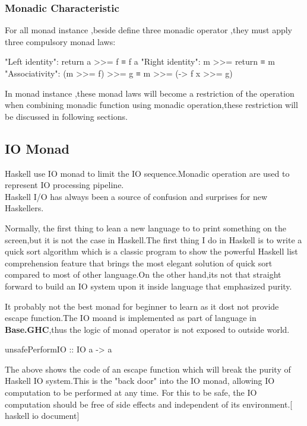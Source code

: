 \subsubsection{Monadic Characteristic}
For all monad instance ,beside define three monadic operator ,they must apply three compulsory monad laws:

\begin{hcode}
"Left identity": return a >>= f  ≡  f a
"Right identity": m >>= return  ≡  m
"Associativity": (m >>= f) >>= g  ≡  m >>= (\x -> f x >>= g)
\end{hcode}

In monad instance ,these monad laws will become a restriction of the operation when combining monadic function using monadic operation,these restriction will be discussed in following sections.


\subsection{IO Monad}
Haskell use IO monad to limit the IO sequence.Monadic operation are used to represent IO processing pipeline.\\

Haskell I/O has always been a source of confusion and surprises for new Haskellers.

Normally, the first thing to lean a new language to to print something on the screen,but it is not the case in Haskell.The first thing I do in Haskell is to write a quick sort algorithm which is a classic program to show the powerful Haskell list comprehension feature that brings the most elegant solution of quick sort compared to most of other language.On the other hand,its not that straight forward to build an IO system upon it inside language that emphasized purity.



It probably not the best monad for beginner to learn as it dost not provide escape function.The IO moand is implemented as part of language in \textbf{Base.GHC},thus the logic of monad operator is not exposed to outside world.

\begin{hcode}
unsafePerformIO :: IO a -> a
\end{hcode}

The above shows the code of an escape function which will break the purity of Haskell IO system.This is the "back door" into the IO monad, allowing IO computation to be performed at any time. For this to be safe, the IO computation should be free of side effects and independent of its environment.[ haskell io document]


